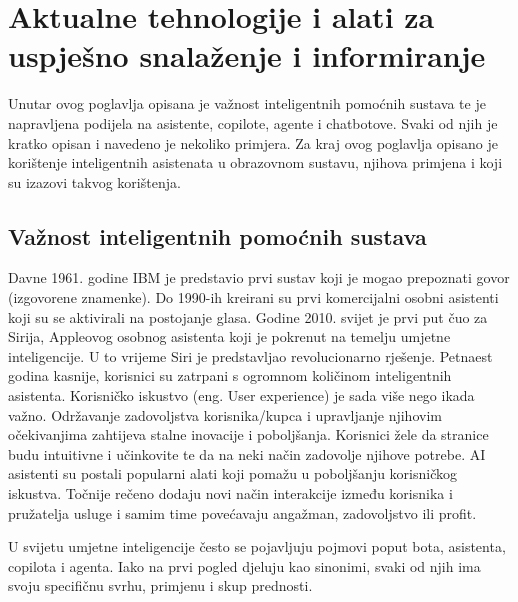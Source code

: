 \documentclass[]{foi}
\begin{document}



\chapter{Aktualne tehnologije i alati za uspješno snalaženje i informiranje}
Unutar ovog poglavlja opisana je važnost inteligentnih pomoćnih sustava te je napravljena podijela na asistente, copilote, agente i chatbotove. Svaki od njih je kratko opisan i navedeno je
nekoliko primjera. Za kraj ovog poglavlja opisano je korištenje inteligentnih asistenata u obrazovnom sustavu, njihova primjena i koji su izazovi takvog korištenja.

\section{Važnost inteligentnih pomoćnih sustava}

Davne 1961. godine IBM je predstavio prvi sustav koji je mogao prepoznati govor (izgovorene znamenke). Do 1990-ih kreirani su prvi komercijalni 
osobni asistenti koji su se aktivirali na postojanje glasa. Godine 2010. svijet je prvi put čuo za Sirija, Appleovog osobnog asistenta koji je 
pokrenut na temelju umjetne inteligencije. U to vrijeme Siri je predstavljao revolucionarno rješenje. Petnaest godina kasnije, korisnici su 
zatrpani s ogromnom količinom inteligentnih asistenta. Korisničko iskustvo (eng. User experience) je sada više nego ikada važno. Održavanje zadovoljstva 
korisnika/kupca i upravljanje njihovim očekivanjima zahtijeva stalne inovacije i poboljšanja. Korisnici žele da stranice budu intuitivne i učinkovite
te da na neki način zadovolje njihove potrebe. AI asistenti su postali popularni alati koji pomažu u poboljšanju korisničkog iskustva.
Točnije rečeno dodaju novi način interakcije između korisnika i pružatelja usluge i samim time povećavaju angažman, zadovoljstvo ili profit.

U svijetu umjetne inteligencije često se pojavljuju pojmovi poput bota, asistenta, copilota i agenta. Iako na prvi pogled djeluju kao sinonimi, svaki od njih ima svoju specifičnu svrhu, primjenu i skup prednosti.
\end{document}
